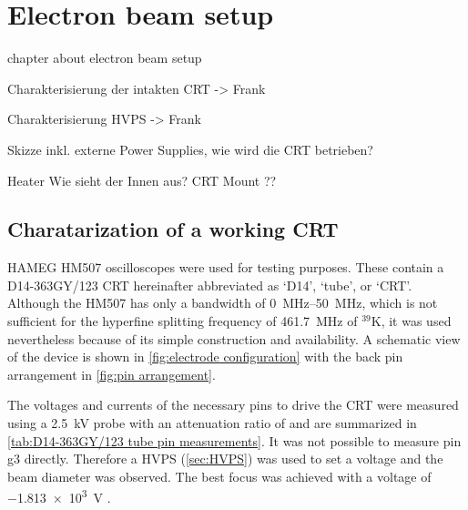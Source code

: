 \chapter{Electron beam setup}\label{ch:Electron beam setup}

chapter about electron beam setup

Charakterisierung der intakten CRT -> Frank 

Charakterisierung HVPS ->  Frank 

Skizze inkl. externe Power Supplies, wie wird die CRT betrieben?

Heater
Wie sieht der Innen aus? 
CRT Mount ??

\section{Charatarization of a working CRT}\label{sec:Charatarization of a working CRT}

HAMEG HM507 oscilloscopes were used for testing purposes. These contain a D14-363GY/123\autocite{D14363GY123-manual} CRT hereinafter abbreviated as `D14', `tube', or `CRT'. Although the HM507 has only a bandwidth of \SIrange{0}{50}{\mega\hertz}, which is not sufficient for the hyperfine splitting frequency of \SI{461.7}{\mega\hertz} of $^{39}\mathrm{K}$, it was used nevertheless because of its simple construction and availability. A schematic view of the device is shown in \cref{fig:electrode configuration} with the back pin arrangement in \cref{fig:pin arrangement}.

The voltages and currents of the necessary pins to drive the CRT were measured using a \SI{2.5}{\kilo\volt} probe  with an attenuation ratio of  and are summarized in \cref{tab:D14-363GY/123 tube pin measurements}. It was not possible to measure pin g3 directly. Therefore a HVPS (\cref{sec:HVPS}) was used to set a voltage and the beam diameter was observed. The best focus was achieved with a voltage of \SI{-1.813e3}{\volt} .

